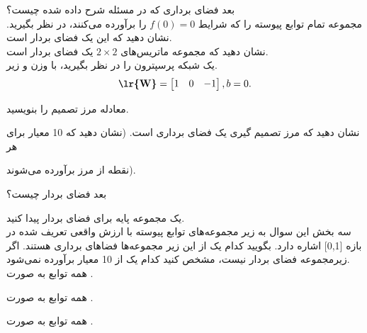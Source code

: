\documentclass[a4paper,12pt]{report}
\begin{document}
	 \hspace{-2.5cm}\textbf{}\hspace{0.6cm}
	 بعد فضای برداری که در مسئله  شرح داده شده چیست؟\\
	 
	 
	 \hspace{-2.5cm}\textbf{}\hspace{0.6cm}
	 مجموعه تمام توابع پیوسته را که شرایط $ f(0)=0 $ را برآورده می‌کنند، در نظر بگیرید. نشان دهید که این یک فضای بردار است.\\
	 	 
	 \hspace{-2.5cm}\textbf{}\hspace{0.6cm}
	 نشان دهید که مجموعه ماتریس‌های 
	 $ 2 \times 2 $
	 یک فضای بردار است.\\
	 	 
	 \hspace{-2.5cm}\textbf{}\hspace{0.6cm}
	 یک شبکه پرسپترون را در نظر بگیرید، با وزن و  زیر.
	 $$
	 \textbf{\lr{W}}=
	 \begin{bmatrix}
	 	1 & 0 & -1
	 \end{bmatrix},
 	 b=0.
	 $$
	 
	 \textbf{}
	 معادله مرز تصمیم را بنویسید.
	 
	 \textbf{}
	 نشان دهید که مرز تصمیم گیری یک فضای برداری است. (نشان دهید که 10 معیار برای هر  
	 	 
	 \hspace{0.5cm}	 نقطه از مرز برآورده می‌شوند).
	 
	 
	 \textbf{}
	 بعد فضای بردار چیست؟
	 
	 
	 \textbf{}
	 یک مجموعه پایه برای فضای بردار پیدا کنید.\\
	 
	 \hspace{-2.5cm}\textbf{}\hspace{0.6cm}
	 سه بخش این سوال به زیر مجموعه‌های توابع پیوسته با ارزش واقعی تعریف شده در بازه [0,1] اشاره دارد. بگویید کدام یک از این زیر مجموعه‌ها فضاهای برداری هستند. اگر زیرمجموعه فضای بردار نیست، مشخص کنید کدام یک از 10 معیار برآورده نمی‌شود.\\
	 
	 \textbf{}
	 همه توابع به صورت .
	 
	 \textbf{}
	 همه توابع به صورت .
	 
	 \textbf{}
	 همه توابع به صورت .\\
	 
\end{document}
